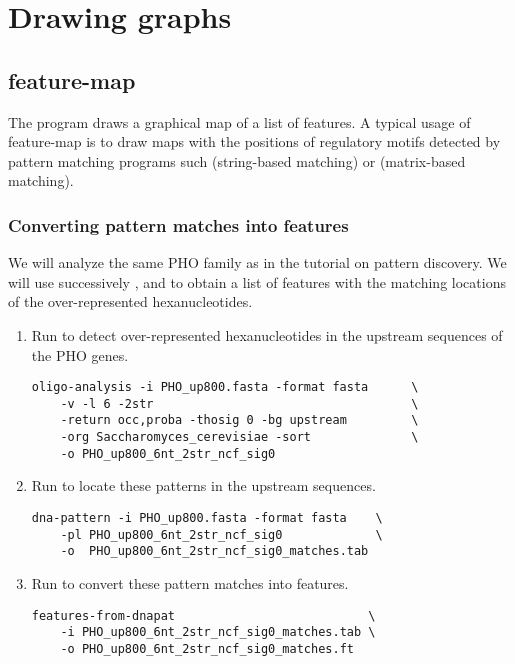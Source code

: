 
\section{Drawing graphs}


\subsection{feature-map}

The program  draws a graphical map of a list of
features. A typical usage of feature-map is to draw maps with the
positions of regulatory motifs detected by pattern matching programs
such  (string-based matching) or 
(matrix-based matching).

\subsubsection{Converting pattern matches into features}

We will analyze the same PHO family as in the tutorial on pattern
discovery. We will use successively ,
 and  to obtain a
list of features with the matching locations of the over-represented
hexanucleotides.

\begin{enumerate}

\item Run  to detect over-represented 
hexanucleotides in the upstream sequences of the PHO
genes.

\begin{verbatim} 
oligo-analysis -i PHO_up800.fasta -format fasta      \
    -v -l 6 -2str                                    \
    -return occ,proba -thosig 0 -bg upstream         \
    -org Saccharomyces_cerevisiae -sort              \
    -o PHO_up800_6nt_2str_ncf_sig0 
\end{verbatim}

\item Run \program{dna-pattern} to locate these patterns in 
the upstream sequences.

\begin{verbatim} 
dna-pattern -i PHO_up800.fasta -format fasta    \
    -pl PHO_up800_6nt_2str_ncf_sig0             \
    -o  PHO_up800_6nt_2str_ncf_sig0_matches.tab
\end{verbatim}

\item Run  to convert these pattern 
matches into features.

\begin{verbatim}
features-from-dnapat                           \
    -i PHO_up800_6nt_2str_ncf_sig0_matches.tab \
    -o PHO_up800_6nt_2str_ncf_sig0_matches.ft 
\end{verbatim}

\end{enumerate}

